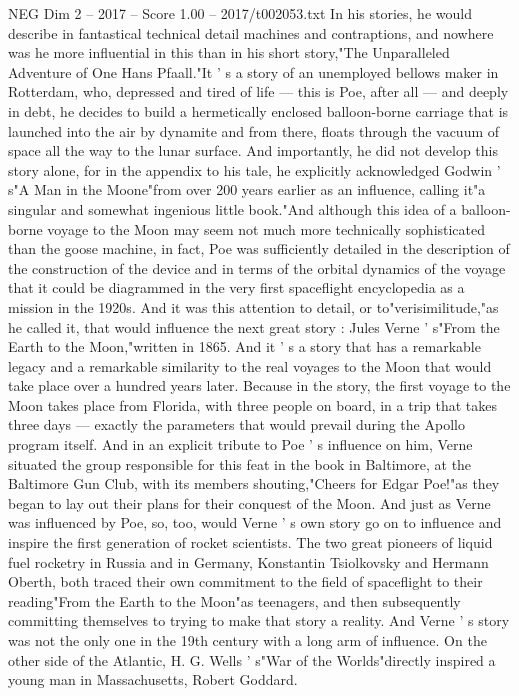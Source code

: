 \begin{textsample}{NEG Dim 2 – 2017 – Score 1.00 – 2017/t002053.txt}
In his stories, he would describe in fantastical technical detail machines and contraptions, and nowhere was he more influential in this than in his short story,"The Unparalleled Adventure of One Hans Pfaall."It ' s a story of an unemployed bellows maker in Rotterdam, who, depressed and tired of life — this is Poe, after all — and deeply in debt, he decides to build a hermetically enclosed balloon-borne carriage that is launched into the air by dynamite and from there, floats through the vacuum of space all the way to the lunar surface.
And importantly, he did not develop this story alone, for in the appendix to his tale, he explicitly acknowledged Godwin ' s"A Man in the Moone"from over 200 years earlier as an influence, calling it"a singular and somewhat ingenious little book."And although this idea of a balloon-borne voyage to the Moon may seem not much more technically sophisticated than the goose machine, in fact, Poe was sufficiently detailed in the description of the construction of the device and in terms of the orbital dynamics of the voyage that it could be diagrammed in the very first spaceflight encyclopedia as a mission in the 1920s.
And it was this attention to detail, or to"verisimilitude,"as he called it, that would influence the next great story : Jules Verne ' s"From the Earth to the Moon,"written in 1865.
And it ' s a story that has a remarkable legacy and a remarkable similarity to the real voyages to the Moon that would take place over a hundred years later.
Because in the story, the first voyage to the Moon takes place from Florida, with three people on board, in a trip that takes three days — exactly the parameters that would prevail during the Apollo program itself.
And in an explicit tribute to Poe ' s influence on him, Verne situated the group responsible for this feat in the book in Baltimore, at the Baltimore Gun Club, with its members shouting,"Cheers for Edgar Poe!"as they began to lay out their plans for their conquest of the Moon.
And just as Verne was influenced by Poe, so, too, would Verne ' s own story go on to influence and inspire the first generation of rocket scientists.
The two great pioneers of liquid fuel rocketry in Russia and in Germany, Konstantin Tsiolkovsky and Hermann Oberth, both traced their own commitment to the field of spaceflight to their reading"From the Earth to the Moon"as teenagers, and then subsequently committing themselves to trying to make that story a reality.
And Verne ' s story was not the only one in the 19th century with a long arm of influence.
On the other side of the Atlantic, H.
G.
Wells ' s"War of the Worlds"directly inspired a young man in Massachusetts, Robert Goddard.

\end{textsample}
